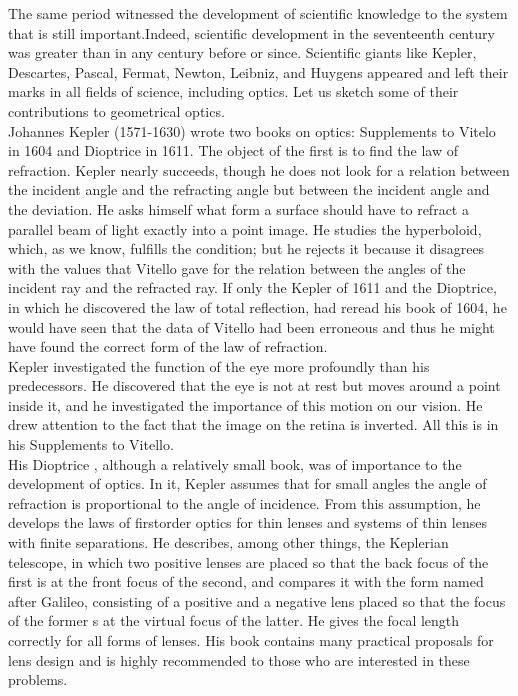             The same period witnessed the development of scientific knowledge to the system that is still important.Indeed, scientific development in the seventeenth century was greater than in any century before or since. Scientific giants like Kepler, Descartes, Pascal, Fermat, Newton, Leibniz, and Huygens appeared and left their marks in all fields of science, including optics. Let us sketch some of their contributions to geometrical optics. \\
            
            Johannes Kepler (1571-1630) wrote two books on optics: Supplements to Vitelo in 1604 and Dioptrice  in 1611. The object of the first is to find the law of refraction. Kepler nearly succeeds, though he does not look for a relation between the incident angle and the refracting angle but between the incident angle and the deviation. He asks himself what form a surface should have to refract a parallel beam of light exactly into a point image. He studies the hyperboloid, which, as we know, fulfills the condition; but he rejects it because it disagrees with the values that Vitello gave for the relation between the angles of the incident ray and the refracted ray. If only the Kepler of 1611 and the Dioptrice, in which he discovered the law of total reflection, had reread his book of 1604, he would have seen that the data of Vitello had been erroneous and thus he might have found the correct form of the law of refraction.\\

            Kepler investigated the function of the eye more profoundly than his predecessors. He discovered that the eye is not at rest but moves around a point inside it, and he investigated the importance of this motion on our vision. He drew attention to the fact that the image on the retina is inverted. All this is in his Supplements to Vitello.\\
            
            His Dioptrice , although a relatively small book, was of importance to the development of optics. In it, Kepler assumes that for small angles the angle of refraction is proportional to the angle of incidence. From this assumption, he develops the laws of firstorder optics for thin lenses and systems of thin lenses with finite separations. He describes, among other things, the Keplerian telescope, in which two positive lenses are placed so that the back focus of the first is at the front focus of the second, and compares it with the form named after Galileo, consisting of a positive and a negative lens placed so that the focus of the former s at the virtual focus of the latter. He gives the focal length correctly for all forms of lenses. His book contains many practical proposals for lens design and is highly recommended to those who are interested in these problems.\\

